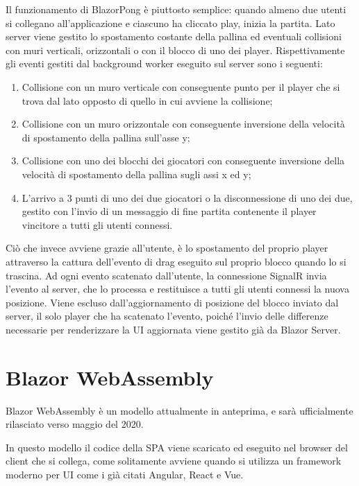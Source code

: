 Il funzionamento di BlazorPong \`e piuttosto semplice: quando almeno due utenti si collegano all'applicazione e ciascuno ha cliccato play, inizia la partita.
Lato server viene gestito lo spostamento costante della pallina ed eventuali collisioni con muri verticali, orizzontali o con il blocco di uno dei player.
Rispettivamente gli eventi gestiti dal background worker eseguito sul server sono i seguenti:
\begin{enumerate}
	\item Collisione con un muro verticale con conseguente punto per il player che si trova dal lato opposto di quello in cui avviene la collisione;
	\item Collisione con un muro orizzontale con conseguente inversione della velocit\`a di spostamento della pallina sull'asse y;
	\item Collisione con uno dei blocchi dei giocatori con conseguente inversione della velocit\`a di spostamento della pallina sugli assi x ed y;
	\item L'arrivo a 3 punti di uno dei due giocatori o la disconnessione di uno dei due, gestito con l'invio di un messaggio di fine partita contenente il player vincitore a tutti gli utenti connessi.
\end{enumerate}

Ci\`o che invece avviene grazie all'utente, \`e lo spostamento del proprio player attraverso la cattura dell'evento di drag eseguito sul proprio blocco quando lo si trascina.
Ad ogni evento scatenato dall'utente, la connessione SignalR invia l'evento al server, che lo processa e restituisce a tutti gli utenti connessi la nuova posizione.
Viene escluso dall'aggiornamento di posizione del blocco inviato dal server, il solo player che ha scatenato l'evento, poich\'e l'invio delle differenze necessarie per renderizzare la UI aggiornata viene gestito gi\`a da Blazor Server.

\pagebreak

\section{Blazor WebAssembly}\label{sez:bwa}
Blazor WebAssembly \`e un modello attualmente in anteprima, e sar\`a ufficialmente rilasciato verso maggio del 2020.

In questo modello il codice della SPA viene scaricato ed eseguito nel browser del client che si collega, come solitamente avviene quando si utilizza un framework moderno per UI come i gi\`a citati Angular, React e Vue.

